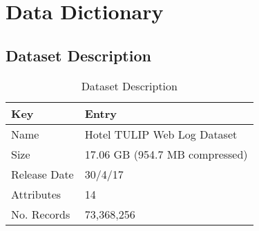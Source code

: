 \section{Data Dictionary}
\label{app:data_dictionary}

\subsection{Dataset Description}
\label{app:data_dictionary:dataset_description}

\begin{table}[h!]
\centering
\caption{Dataset Description}
\label{tab:dataset_description}
\vspace{12pt}
\begin{tabular}{@{}ll@{}}
\toprule
\textbf{Key}          & \textbf{Entry}                                                                                                                                                                                                                                                                             \\ \midrule
Name         & Hotel TULIP Web Log Dataset                                                                                                                                                                                                                                                       \\
Size         & 17.06 GB (954.7 MB compressed)                                                                                                                                                                                                                                                    \\
Release Date & 30/4/17                                                                                                                                                                                                                                                                           \\
Attributes   & 14                                                                                                                                                                                                                                                                                \\
No. Records  & 73,368,256                                                                                                                                                                                                                                                                        \\

\end{tabular}
\end{table}
